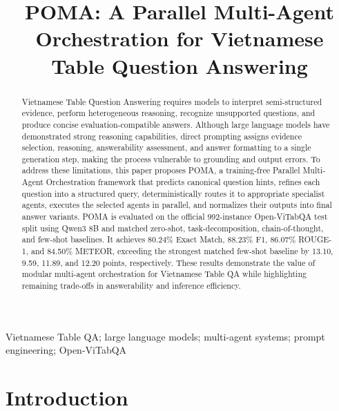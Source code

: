 \documentclass[]{interact}
\begin{document}
\title{POMA: A Parallel Multi-Agent Orchestration for Vietnamese Table Question Answering}

\author{
}

\maketitle

\begin{abstract}
Vietnamese Table Question Answering requires models to interpret semi-structured evidence, perform heterogeneous reasoning, recognize unsupported questions, and produce concise evaluation-compatible answers. Although large language models have demonstrated strong reasoning capabilities, direct prompting assigns evidence selection, reasoning, answerability assessment, and answer formatting to a single generation step, making the process vulnerable to grounding and output errors. To address these limitations, this paper proposes POMA, a training-free Parallel Multi-Agent Orchestration framework that predicts canonical question hints, refines each question into a structured query, deterministically routes it to appropriate specialist agents, executes the selected agents in parallel, and normalizes their outputs into final answer variants. POMA is evaluated on the official 992-instance Open-ViTabQA test split using Qwen3 8B and matched zero-shot, task-decomposition, chain-of-thought, and few-shot baselines. It achieves 80.24\% Exact Match, 88.23\% F1, 86.07\% ROUGE-1, and 84.50\% METEOR, exceeding the strongest matched few-shot baseline by 13.10, 9.59, 11.89, and 12.20 points, respectively. These results demonstrate the value of modular multi-agent orchestration for Vietnamese Table QA while highlighting remaining trade-offs in answerability and inference efficiency.
\end{abstract}

\begin{keywords}
Vietnamese Table QA; large language models; multi-agent systems; prompt engineering; Open-ViTabQA
\end{keywords}

\section{Introduction}\label{sec:introduction}
\end{document}
